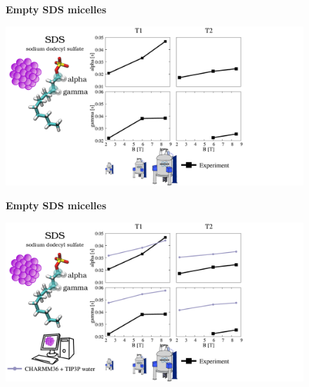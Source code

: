 \documentclass{beamer}
\begin{document}
\addtocounter{framenumber}{-1}
\begin{frame}
\begin{center}
\Large{\centering

\textbf{Empty SDS micelles} \\}

\vspace{0.5cm}


\includegraphics[height=6cm]{sds5.pdf}
\end{center}
\end{frame}

\addtocounter{framenumber}{-1}
\begin{frame}
\begin{center}
\Large{\centering

\textbf{Empty SDS micelles} \\}

\vspace{0.5cm}


\includegraphics[height=6cm]{sds4.pdf}
\end{center}
\end{frame}
\end{document}
